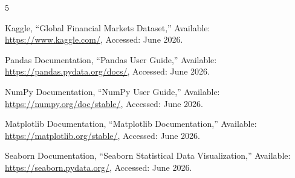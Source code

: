 \documentclass[10pt,a4paper,twocolumn]{article}
\begin{document}
{\small
\begin{thebibliography}{5}

Kaggle,
``Global Financial Markets Dataset,''
Available: \url{https://www.kaggle.com/},
Accessed: June 2026.

Pandas Documentation,
``Pandas User Guide,''
Available: \url{https://pandas.pydata.org/docs/},
Accessed: June 2026.

NumPy Documentation,
``NumPy User Guide,''
Available: \url{https://numpy.org/doc/stable/},
Accessed: June 2026.

Matplotlib Documentation,
``Matplotlib Documentation,''
Available: \url{https://matplotlib.org/stable/},
Accessed: June 2026.

Seaborn Documentation,
``Seaborn Statistical Data Visualization,''
Available: \url{https://seaborn.pydata.org/},
Accessed: June 2026.

\end{thebibliography}
}
\end{document}
